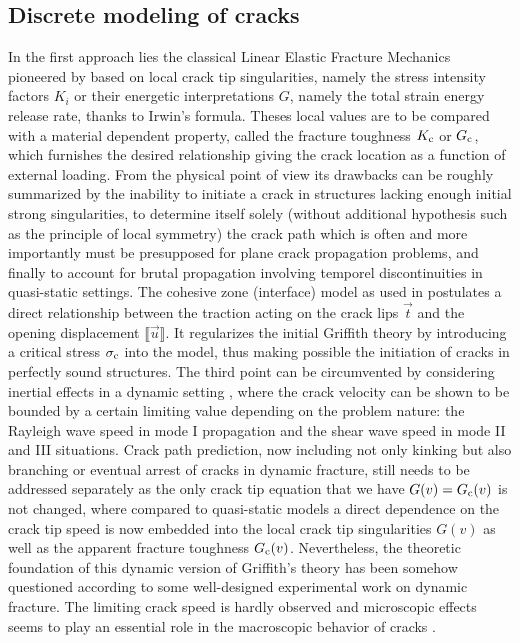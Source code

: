 \subsection{Discrete modeling of cracks}
In the first approach lies the classical Linear Elastic Fracture Mechanics pioneered by \cite{Griffith:1921} based on local crack tip singularities, namely the stress intensity factors $K_i$ or their energetic interpretations $G$, namely the total strain energy release rate, thanks to Irwin's formula. Theses local values are to be compared with a material dependent property, called the fracture toughness $K_{\mathrm{c}}$ or $G_\mathrm{c}$, which furnishes the desired relationship giving the crack location as a function of external loading. From the physical point of view its drawbacks can be roughly summarized \cite{FrancfortMarigo:1998} by the inability to initiate a crack in structures lacking enough initial strong singularities, to determine itself solely (without additional hypothesis such as the principle of local symmetry) the crack path which is often and more importantly must be presupposed for plane crack propagation problems, and finally to account for brutal propagation involving temporel discontinuities in quasi-static settings. The cohesive zone (interface) model as used in \cite{DebruyneLaverneDumouchel:2012,RuizOrtizPandolfi:2000} postulates a direct relationship between the traction acting on the crack lips $\vec{t}$ and the opening displacement $\llbracket\vec{u}\rrbracket$. It regularizes the initial Griffith theory by introducing a critical stress $\sigma_{\mathrm{c}}$ into the model, thus making possible the initiation of cracks in perfectly sound structures. The third point can be circumvented by considering inertial effects in a dynamic setting \cite{Freund:1990}, where the crack velocity can be shown to be bounded by a certain limiting value depending on the problem nature: the Rayleigh wave speed in mode I propagation and the shear wave speed in mode II and III situations. Crack path prediction, now including not only kinking but also branching or eventual arrest of cracks in dynamic fracture, still needs to be addressed separately as the only crack tip equation that we have $G(v)=G_\mathrm{c}(v)$ is not changed, where compared to quasi-static models a direct dependence on the crack tip speed is now embedded into the local crack tip singularities $G(v)$ as well as the apparent fracture toughness $G_\mathrm{c}(v)$. Nevertheless, the theoretic foundation of this dynamic version of Griffith's theory has been somehow questioned \cite{ValorosoDebruyneLaverne:2014} according to some well-designed experimental work on dynamic fracture. The limiting crack speed is hardly observed and microscopic effects seems to play an essential role in the macroscopic behavior of cracks \cite{Ravi-ChandarKnauss:1984a}.

